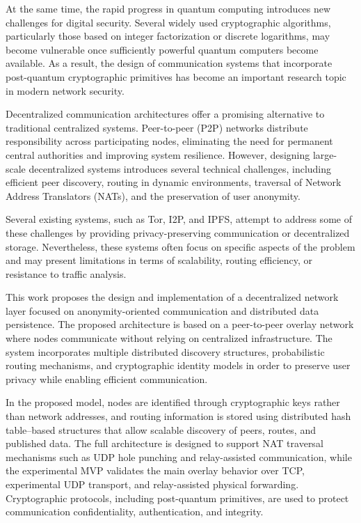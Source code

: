 \documentclass[12pt]{article}
\begin{document}
At the same time, the rapid progress in quantum computing introduces new challenges for digital security. Several widely used cryptographic algorithms, particularly those based on integer factorization or discrete logarithms, may become vulnerable once sufficiently powerful quantum computers become available. As a result, the design of communication systems that incorporate post-quantum cryptographic primitives has become an important research topic in modern network security.

Decentralized communication architectures offer a promising alternative to traditional centralized systems. Peer-to-peer (P2P) networks distribute responsibility across participating nodes, eliminating the need for permanent central authorities and improving system resilience. However, designing large-scale decentralized systems introduces several technical challenges, including efficient peer discovery, routing in dynamic environments, traversal of Network Address Translators (NATs), and the preservation of user anonymity.

Several existing systems, such as Tor, I2P, and IPFS, attempt to address some of these challenges by providing privacy-preserving communication or decentralized storage. Nevertheless, these systems often focus on specific aspects of the problem and may present limitations in terms of scalability, routing efficiency, or resistance to traffic analysis.

This work proposes the design and implementation of a decentralized network layer focused on anonymity-oriented communication and distributed data persistence. The proposed architecture is based on a peer-to-peer overlay network where nodes communicate without relying on centralized infrastructure. The system incorporates multiple distributed discovery structures, probabilistic routing mechanisms, and cryptographic identity models in order to preserve user privacy while enabling efficient communication.

In the proposed model, nodes are identified through cryptographic keys rather than network addresses, and routing information is stored using distributed hash table--based structures that allow scalable discovery of peers, routes, and published data. The full architecture is designed to support NAT traversal mechanisms such as UDP hole punching and relay-assisted communication, while the experimental MVP validates the main overlay behavior over TCP, experimental UDP transport, and relay-assisted physical forwarding. Cryptographic protocols, including post-quantum primitives, are used to protect communication confidentiality, authentication, and integrity.
\end{document}
